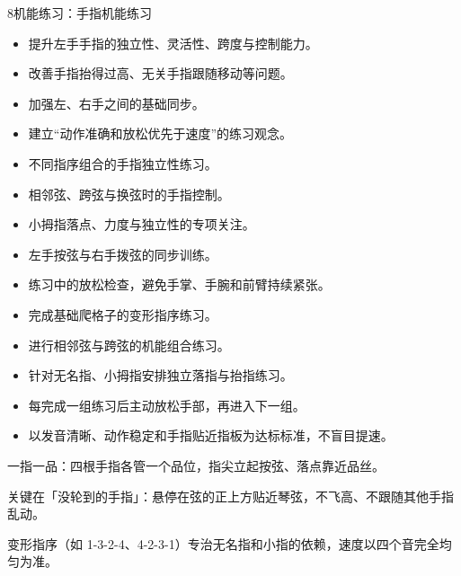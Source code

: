\begin{lessoncard}{8}{机能练习：手指机能练习}
\begin{itemize}
\item 提升左手手指的独立性、灵活性、跨度与控制能力。
\item 改善手指抬得过高、无关手指跟随移动等问题。
\item 加强左、右手之间的基础同步。
\item 建立“动作准确和放松优先于速度”的练习观念。
\end{itemize}
\begin{itemize}
\item 不同指序组合的手指独立性练习。
\item 相邻弦、跨弦与换弦时的手指控制。
\item 小拇指落点、力度与独立性的专项关注。
\item 左手按弦与右手拨弦的同步训练。
\item 练习中的放松检查，避免手掌、手腕和前臂持续紧张。
\end{itemize}
\begin{itemize}
\item 完成基础爬格子的变形指序练习。
\item 进行相邻弦与跨弦的机能组合练习。
\item 针对无名指、小拇指安排独立落指与抬指练习。
\item 每完成一组练习后主动放松手部，再进入下一组。
\item 以发音清晰、动作稳定和手指贴近指板为达标标准，不盲目提速。
\end{itemize}
\begin{fignote}
\begin{center}
\end{center}
\begin{fignotes}
\item 一指一品：四根手指各管一个品位，指尖立起按弦、落点靠近品丝。
\item 关键在「没轮到的手指」：悬停在弦的正上方贴近琴弦，不飞高、不跟随其他手指乱动。
\item 变形指序（如 1-3-2-4、4-2-3-1）专治无名指和小指的依赖，速度以四个音完全均匀为准。
\end{fignotes}
\end{fignote}
\end{lessoncard}

